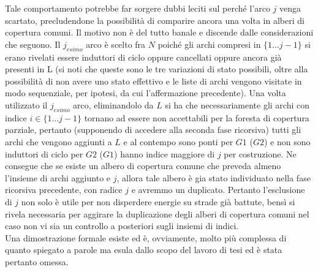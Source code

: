 Tale comportamento potrebbe far sorgere dubbi leciti sul perché l'arco $j$ venga scartato, precludendone la possibilità di comparire ancora una volta in alberi di copertura comuni. Il motivo non è del tutto banale e discende dalle considerazioni che seguono. Il $j_{esimo}$ arco è scelto fra $N$ poiché gli archi compresi in $\{ 1\dots j-1\}$ si erano rivelati essere induttori di ciclo oppure cancellati oppure ancora già presenti in L (si noti che queste sono le tre variazioni di stato possibili, oltre alla possibilità di non avere uno stato effettivo e le liste di archi vengono visitate in modo sequenziale, per ipotesi, da cui l'affermazione precedente). Una volta utilizzato il $j_{esimo}$ arco, eliminandolo da $L$ si ha che necessariamente gli archi con indice $i \in \{ 1\dots j-1\}$ tornano ad essere non accettabili per la foresta di copertura parziale, pertanto (supponendo di accedere alla seconda fase ricorsiva) tutti gli archi che vengono aggiunti a $L$ e al contempo sono ponti per $G1$ ($G2$) e non sono induttori di ciclo per $G2$ ($G1$) hanno indice maggiore di $j$ per costruzione. Ne consegue che se esiste un albero di copertura comune che preveda almeno l'insieme di archi aggiunto e $j$, allora tale albero è gia stato individuato nella fase ricorsiva precedente, con radice $j$ e avremmo un duplicato. Pertanto l'esclusione di $j$ non solo è utile per non disperdere energie su strade già battute, bensì si rivela necessaria per aggirare la duplicazione degli alberi di copertura comuni nel caso non vi sia un controllo a posteriori sugli insiemi di indici.\\
Una dimostrazione formale esiste ed è, ovviamente, molto più complessa di quanto spiegato a parole ma esula dallo scopo del lavoro di tesi ed è stata pertanto omessa.
